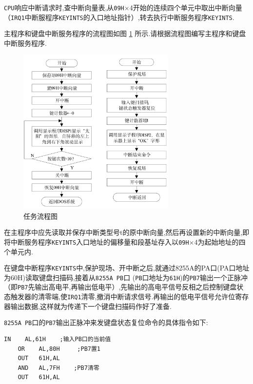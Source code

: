 \documentclass[11pt]{SEU-Digital-Report}
\begin{document}
\texttt{CPU}响应中断请求时,查中断向量表,从\texttt{09H}$\times$4开始的连续四个单元中取出中断向量（\texttt{IRQ1}中断服程序\texttt{KEYINTS}的入口地址指针）,转去执行中断服务程序\texttt{KEYINTS}.

主程序和键盘中断服务程序的流程图如图 \ref{fig:process} 所示.请根据流程图编写主程序和键盘中断服务程序.

\begin{figure}
    \centering
    \includegraphics[width=0.7\textwidth]{fig/process.png}
    \caption{任务流程图}
    \label{fig:process}
\end{figure}

在主程序中应先读取并保存中断类型号t的原中断向量,然后再设置新的中断向量,即将中断服务程序\texttt{KEYINTS}入口地址的偏移量和段基址存入以\texttt{09H}$\times$4为起始地址的四个单元内.

在键盘中断程序\texttt{KEYINTS}中,保护现场、开中断之后,就通过8255A的PA口(PA口地址为60H)读取键盘扫描码,接着从\texttt{8255A PB}口 (\texttt{PB}口地址为\texttt{61H})的\texttt{PB7}输出一个正脉冲（即\texttt{PB7}先输出高电平,再输出低电平）,先输出的高电平信号反相之后控制键盘状态触发器的清零端,使\texttt{IRQ1}清零,撤消中断请求信号.再输出的低电平信号允许位寄存器输出数据,这样就为传递下一个键盘扫描码作好了准备.

\texttt{8255A PB}口的\texttt{PB7}输出正脉冲来发键盘状态复位命令的具体指令如下:
\begin{lstlisting}[language={[x86masm]Assembler},title=code]
    IN    AL,61H    ;输入PB口的当前值
    OR    AL,80H     ;PB7置1
    OUT   61H,AL
    AND   AL,7FH    ;PB7清零
    OUT   61H,AL
\end{lstlisting}
\end{document}
